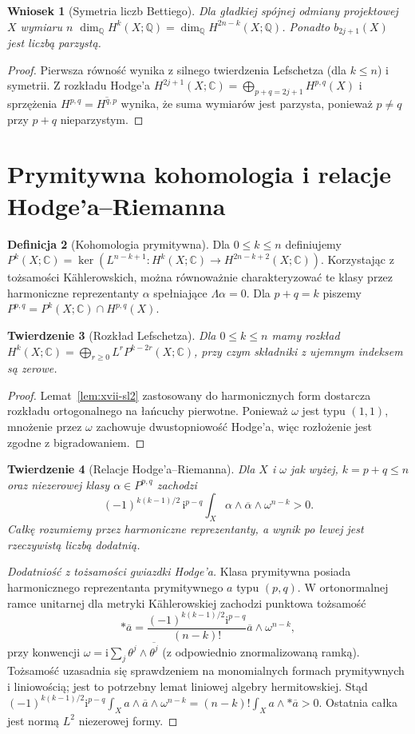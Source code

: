 \documentclass[11pt,a4paper,oneside]{report}
\newcommand{\C}{\mathbb{C}}
\newcommand{\Q}{\mathbb{Q}}
\theoremstyle{plain}
\newtheorem{twierdzenie}{Twierdzenie}[section]
\newtheorem{wniosek}[twierdzenie]{Wniosek}
\theoremstyle{definition}
\newtheorem{definicja}[twierdzenie]{Definicja}
\theoremstyle{remark}
\begin{document}
\begin{wniosek}[Symetria liczb Bettiego]
Dla gładkiej spójnej odmiany projektowej $X$ wymiaru $n$
$\dim_\Q H^k(X;\Q)=\dim_\Q H^{2n-k}(X;\Q)$.
Ponadto $b_{2j+1}(X)$ jest liczbą parzystą.
\end{wniosek}
\begin{proof}
Pierwsza równość wynika z silnego twierdzenia Lefschetza
(dla $k\le n$) i symetrii.
Z rozkładu Hodge'a $H^{2j+1}(X;\C)=
\bigoplus_{p+q=2j+1}H^{p,q}(X)$ i sprzężenia
$H^{p,q}=\overline{H^{q,p}}$ wynika, że suma wymiarów
jest parzysta, ponieważ $p\ne q$ przy $p+q$ nieparzystym.
\end{proof}

\section{Prymitywna kohomologia i relacje Hodge'a--Riemanna}
\begin{definicja}[Kohomologia prymitywna]
Dla $0\le k\le n$ definiujemy
$P^k(X;\C)=\ker(L^{n-k+1}:H^k(X;\C)\to H^{2n-k+2}(X;\C))$.
Korzystając z tożsamości Kählerowskich, można równoważnie
charakteryzować te klasy przez harmoniczne reprezentanty
$\alpha$ spełniające $\Lambda\alpha=0$.
Dla $p+q=k$ piszemy $P^{p,q}=P^k(X;\C)\cap H^{p,q}(X)$.
\end{definicja}
\begin{twierdzenie}[Rozkład Lefschetza]
\label{thm:xvii-decomposition}
Dla $0\le k\le n$ mamy rozkład
$H^k(X;\C)=\bigoplus_{r\ge0}L^rP^{k-2r}(X;\C)$,
przy czym składniki z ujemnym indeksem są zerowe.
\end{twierdzenie}
\begin{proof}
Lemat~\ref{lem:xvii-sl2} zastosowany do harmonicznych form
dostarcza rozkładu ortogonalnego na łańcuchy pierwotne.
Ponieważ $\omega$ jest typu $(1,1)$, mnożenie przez
$\omega$ zachowuje dwustopniowość Hodge'a, więc
rozłożenie jest zgodne z bigradowaniem.
\end{proof}
\begin{twierdzenie}[Relacje Hodge'a--Riemanna]
\label{thm:xvii-HR}
Dla $X$ i $\omega$ jak wyżej, $k=p+q\le n$ oraz
niezerowej klasy $\alpha\in P^{p,q}$ zachodzi
\[
(-1)^{k(k-1)/2}\,\mathrm i^{p-q}
\int_X\alpha\wedge\overline\alpha\wedge\omega^{n-k}>0.
\]
Całkę rozumiemy przez harmoniczne reprezentanty,
a wynik po lewej jest rzeczywistą liczbą dodatnią.
\end{twierdzenie}
\begin{proof}[Dodatniość z tożsamości gwiazdki Hodge'a]
Klasa prymitywna posiada harmonicznego reprezentanta
prymitywnego $a$ typu $(p,q)$. W ortonormalnej ramce
unitarnej dla metryki Kählerowskiej zachodzi punktowa
tożsamość
\[
*\overline a=
\frac{(-1)^{k(k-1)/2}\mathrm i^{p-q}}{(n-k)!}
\overline a\wedge\omega^{n-k},
\]
przy konwencji $\omega=\mathrm i\sum_j\theta^j\wedge
\overline{\theta^j}$ (z odpowiednio znormalizowaną ramką).
Tożsamość uzasadnia się sprawdzeniem na monomialnych
formach prymitywnych i liniowością; jest to potrzebny
lemat liniowej algebry hermitowskiej. Stąd
$(-1)^{k(k-1)/2}\mathrm i^{p-q}\int_X a\wedge
\overline a\wedge\omega^{n-k}=(n-k)!\int_X a\wedge *\overline a>0$.
Ostatnia całka jest normą $L^2$ niezerowej formy.
\end{proof}
\end{document}
